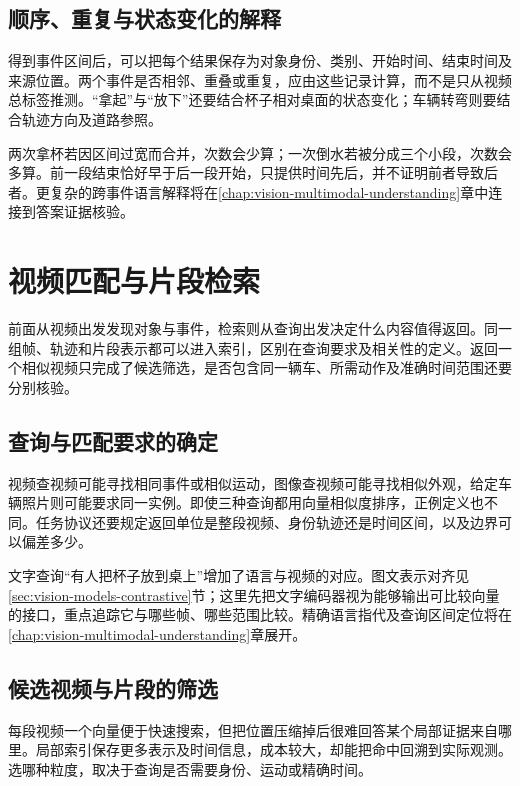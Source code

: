 \subsection{顺序、重复与状态变化的解释}
\label{sec:vision-video-event-relations}

得到事件区间后，可以把每个结果保存为对象身份、类别、开始时间、结束时间及来源位置。两个事件是否相邻、重叠或重复，应由这些记录计算，而不是只从视频总标签推测。“拿起”与“放下”还要结合杯子相对桌面的状态变化；车辆转弯则要结合轨迹方向及道路参照。

两次拿杯若因区间过宽而合并，次数会少算；一次倒水若被分成三个小段，次数会多算。前一段结束恰好早于后一段开始，只提供时间先后，并不证明前者导致后者。更复杂的跨事件语言解释将在\ref{chap:vision-multimodal-understanding}章中连接到答案证据核验。

\section{视频匹配与片段检索}
\label{sec:vision-video-retrieval}

前面从视频出发发现对象与事件，检索则从查询出发决定什么内容值得返回。同一组帧、轨迹和片段表示都可以进入索引，区别在查询要求及相关性的定义。返回一个相似视频只完成了候选筛选，是否包含同一辆车、所需动作及准确时间范围还要分别核验。

\subsection{查询与匹配要求的确定}
\label{sec:vision-video-query}

视频查视频可能寻找相同事件或相似运动，图像查视频可能寻找相似外观，给定车辆照片则可能要求同一实例。即使三种查询都用向量相似度排序，正例定义也不同。任务协议还要规定返回单位是整段视频、身份轨迹还是时间区间，以及边界可以偏差多少。

文字查询“有人把杯子放到桌上”增加了语言与视频的对应。图文表示对齐见\ref{sec:vision-models-contrastive}节；这里先把文字编码器视为能够输出可比较向量的接口，重点追踪它与哪些帧、哪些范围比较。精确语言指代及查询区间定位将在\ref{chap:vision-multimodal-understanding}章展开。

\subsection{候选视频与片段的筛选}
\label{sec:vision-video-candidates}

每段视频一个向量便于快速搜索，但把位置压缩掉后很难回答某个局部证据来自哪里。局部索引保存更多表示及时间信息，成本较大，却能把命中回溯到实际观测。选哪种粒度，取决于查询是否需要身份、运动或精确时间。

